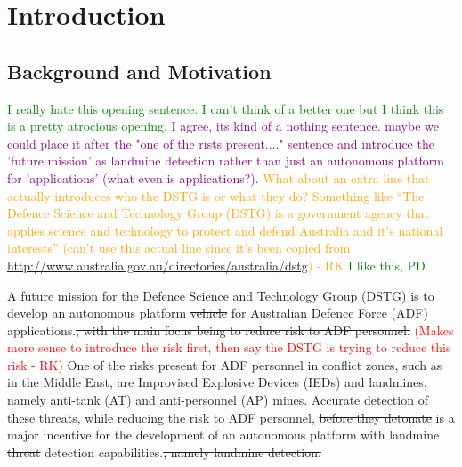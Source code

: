 \documentclass[main.tex]{subfiles}
\begin{document}

\chapter{Introduction}

\section{Background and Motivation}
\textcolor{green}{I really hate this opening sentence. I can't think of a better one but I think this is a pretty atrocious opening.}
\textcolor{purple}{I agree, its kind of a nothing sentence. maybe we could place it after the "one of the rists present...." sentence and introduce the 'future mission' as landmine detection rather than just an autonomous platform for 'applications' (what even is applications?).}
\textcolor{orange}{What about an extra line that actually introduces who the DSTG is or what they do? Something like ``The Defence Science and Technology Group (DSTG) is a government agency that applies science and technology to protect and defend Australia and it's national interests'' (can't use this actual line since it's been copied from \url{http://www.australia.gov.au/directories/australia/dstg}) - RK} \textcolor{green}{I like this, PD} 

A future mission for the Defence Science and Technology Group (DSTG) is to develop an autonomous platform \sout{vehicle} for Australian Defence Force (ADF) applications.\sout{, with the main focus being to reduce risk to ADF personnel.} 
\textcolor{red}{(Makes more sense to introduce the risk first, then say the DSTG is trying to reduce this risk - RK)} 
One of the risks present for ADF personnel in conflict zones, such as in the Middle East, are Improvised Explosive Devices (IEDs) and landmines, namely anti-tank (AT) and anti-personnel (AP) mines. Accurate detection of these threats, while reducing the risk to ADF personnel, \sout{before they detonate} is a major incentive for the development of an autonomous platform with landmine \sout{threat} detection capabilities.\sout{, namely landmine detection.}
\\
% 
% 
%
%
%
\end{document}
